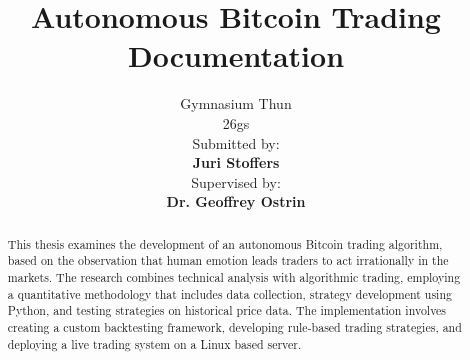 \documentclass[12pt]{article}
\begin{document}


\title{\Huge Autonomous Bitcoin Trading\\\vspace{1cm}\Large Documentation}
\author{
    \Large Gymnasium Thun\\
     26gs\\
    \vspace{1cm}
    \Large Submitted by:\\
    \vspace{0.5cm}
    \textbf{Juri Stoffers}\\
    \vspace{2cm}
    \Large Supervised by:\\
    \vspace{0.5cm}
    \textbf{Dr. Geoffrey Ostrin}
}

\maketitle
\clearpage

\begin{abstract}
    This thesis examines the development of an autonomous Bitcoin trading algorithm, based on the observation that human emotion leads traders to act irrationally in the markets.
    The research combines technical analysis with algorithmic trading, employing a quantitative methodology that includes data collection, strategy development using Python, and testing strategies on historical price data. The implementation involves creating a custom backtesting framework, developing rule-based trading strategies, and deploying a live trading system on a Linux based server.

\end{abstract}
\clearpage

\end{document}
